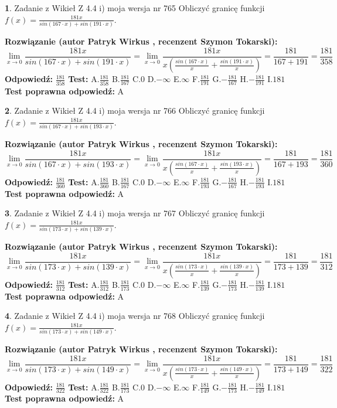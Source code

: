 \documentclass[12pt, a4paper]{article}
\theoremstyle{definition} %
\newtheorem{zad}{}
\newcommand{\zadStart}[1]{\begin{zad}#1\newline}
\newcommand{\zadStop}{\end{zad}}
\newcommand{\rozwStart}[2]{\noindent \textbf{Rozwiązanie (autor #1 , recenzent #2): }\newline}
\newcommand{\rozwStop}{\newline}
\newcommand{\odpStart}{\noindent \textbf{Odpowiedź:}\newline}
\newcommand{\odpStop}{\newline}
\newcommand{\testStart}{\noindent \textbf{Test:}\newline}
\newcommand{\testStop}{\newline}
\newcommand{\kluczStart}{\noindent \textbf{Test poprawna odpowiedź:}\newline}
\newcommand{\kluczStop}{\newline}
\begin{document}
\zadStart{Zadanie z Wikieł Z 4.4 i) moja wersja nr 765}
Obliczyć granicę funkcji $f(x)=\frac{181x}{sin(167\cdot x) +sin(191\cdot x)}$.
\zadStop
\rozwStart{Patryk Wirkus}{Szymon Tokarski}
$$\lim\limits_{x\to 0}\frac{181x}{sin(167\cdot x) +sin(191\cdot x)}=\lim\limits_{x\to 0}\frac{181x}{x(\frac{sin(167\cdot x)}{x}+\frac{sin(191\cdot x)}{x})}=\frac{181}{167+191} = \frac{181}{358}$$
\rozwStop
\odpStart
$\frac{181}{358}$
\odpStop
\testStart
A.$\frac{181}{358}$
B.$\frac{181}{167}$
C.$0$
D.$-\infty$
E.$\infty$
F.$\frac{181}{191}$
G.$-\frac{181}{167}$
H.$-\frac{181}{191}$
I.$181$
\testStop
\kluczStart
A
\kluczStop



\zadStart{Zadanie z Wikieł Z 4.4 i) moja wersja nr 766}
Obliczyć granicę funkcji $f(x)=\frac{181x}{sin(167\cdot x) +sin(193\cdot x)}$.
\zadStop
\rozwStart{Patryk Wirkus}{Szymon Tokarski}
$$\lim\limits_{x\to 0}\frac{181x}{sin(167\cdot x) +sin(193\cdot x)}=\lim\limits_{x\to 0}\frac{181x}{x(\frac{sin(167\cdot x)}{x}+\frac{sin(193\cdot x)}{x})}=\frac{181}{167+193} = \frac{181}{360}$$
\rozwStop
\odpStart
$\frac{181}{360}$
\odpStop
\testStart
A.$\frac{181}{360}$
B.$\frac{181}{167}$
C.$0$
D.$-\infty$
E.$\infty$
F.$\frac{181}{193}$
G.$-\frac{181}{167}$
H.$-\frac{181}{193}$
I.$181$
\testStop
\kluczStart
A
\kluczStop



\zadStart{Zadanie z Wikieł Z 4.4 i) moja wersja nr 767}
Obliczyć granicę funkcji $f(x)=\frac{181x}{sin(173\cdot x) +sin(139\cdot x)}$.
\zadStop
\rozwStart{Patryk Wirkus}{Szymon Tokarski}
$$\lim\limits_{x\to 0}\frac{181x}{sin(173\cdot x) +sin(139\cdot x)}=\lim\limits_{x\to 0}\frac{181x}{x(\frac{sin(173\cdot x)}{x}+\frac{sin(139\cdot x)}{x})}=\frac{181}{173+139} = \frac{181}{312}$$
\rozwStop
\odpStart
$\frac{181}{312}$
\odpStop
\testStart
A.$\frac{181}{312}$
B.$\frac{181}{173}$
C.$0$
D.$-\infty$
E.$\infty$
F.$\frac{181}{139}$
G.$-\frac{181}{173}$
H.$-\frac{181}{139}$
I.$181$
\testStop
\kluczStart
A
\kluczStop



\zadStart{Zadanie z Wikieł Z 4.4 i) moja wersja nr 768}
Obliczyć granicę funkcji $f(x)=\frac{181x}{sin(173\cdot x) +sin(149\cdot x)}$.
\zadStop
\rozwStart{Patryk Wirkus}{Szymon Tokarski}
$$\lim\limits_{x\to 0}\frac{181x}{sin(173\cdot x) +sin(149\cdot x)}=\lim\limits_{x\to 0}\frac{181x}{x(\frac{sin(173\cdot x)}{x}+\frac{sin(149\cdot x)}{x})}=\frac{181}{173+149} = \frac{181}{322}$$
\rozwStop
\odpStart
$\frac{181}{322}$
\odpStop
\testStart
A.$\frac{181}{322}$
B.$\frac{181}{173}$
C.$0$
D.$-\infty$
E.$\infty$
F.$\frac{181}{149}$
G.$-\frac{181}{173}$
H.$-\frac{181}{149}$
I.$181$
\testStop
\kluczStart
A
\kluczStop
\end{document}
